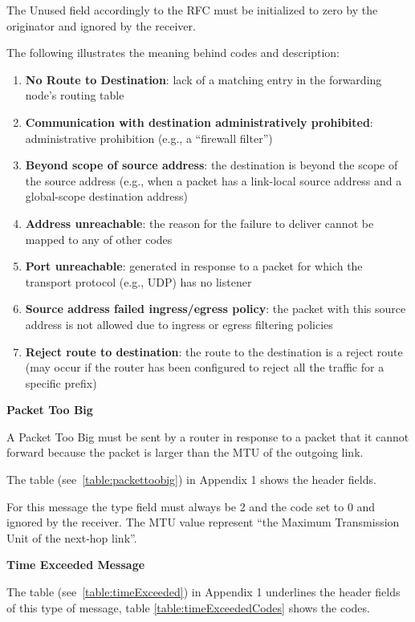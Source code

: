 \documentclass[12pt]{article}
\begin{document}
The Unused field accordingly to the RFC must be initialized to zero by the originator and ignored by the receiver.

The following illustrates the meaning behind codes and description:
\vspace{-15pt}
\begin{enumerate}[noitemsep,topsep=0pt,partopsep=0pt]
 \item \textbf{No Route to Destination}: lack of a matching entry in the forwarding node's routing table
 \item \textbf{Communication with destination administratively prohibited}: administrative prohibition (e.g., a ``firewall filter'')
 \item \textbf{Beyond scope of source address}: the destination is beyond the scope of the source address (e.g., when a packet has a link-local source address and a global-scope destination address)
 \item \textbf{Address unreachable}: the reason for the failure to deliver cannot be mapped to any of other codes
 \item \textbf{Port unreachable}: generated in response to a packet for which the transport protocol (e.g., UDP) has no listener
 \item \textbf{Source address failed ingress/egress policy}: the packet with this source address is not allowed due to ingress or egress filtering policies
 \item \textbf{Reject route to destination}: the route to the destination is a reject route (may occur if the router has been configured to reject all the traffic for a specific prefix)
\end{enumerate}

\textbf{Packet Too Big}

A Packet Too Big must be sent by a router in response to a packet that it cannot forward because the packet is larger than the MTU of the outgoing link.

The table (see~\ref{table:packettoobig}) in Appendix 1 shows the header fields.

For this message the type field must always be 2 and the code set to 0 and ignored by the receiver. The MTU value represent ``the Maximum Transmission Unit of the next-hop link''.

\textbf{Time Exceeded Message}

The table (see~\ref{table:timeExceeded}) in Appendix 1 underlines the header fields of this type of message, table \ref{table:timeExceededCodes} shows the codes.
\end{document}
